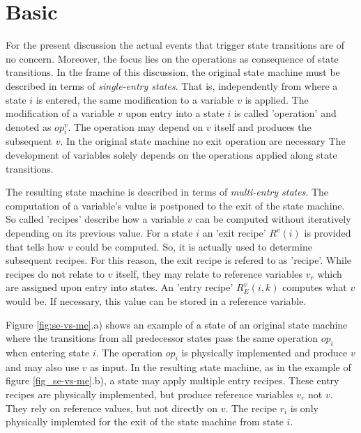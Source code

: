 \documentclass[12pt,a4paper]{scrartcl}
\begin{document}
%
\section{Basic}

For the present discussion the actual events that trigger state transitions are
of no concern. Moreover, the focus lies on the operations as consequence of
state transitions. In the frame of this discussion, the original state machine
must be described in terms of \textit{single-entry states}. That is,
independently from where a state $i$ is entered, the same modification to a
variable $v$ is applied. The modification of a variable $v$ upon entry into a
state $i$ is called 'operation' and denoted as $op^v_i$. The operation may
depend on $v$ itself and produces the subsequent $v$. In the original state
machine no exit operation are necessary The development of variables solely
depends on the operations applied along state transitions. 

The resulting state machine is described in terms of \textit{multi-entry
states}. The computation of a variable's value is postponed to the exit of the
state machine. So called 'recipes' describe how a variable $v$ can be computed
without iteratively depending on its previous value.  For a state $i$ an 'exit
recipe' $R^v(i)$ is provided that tells how $v$ could be computed.  So, it is
actually used to determine subsequent recipes. For this reason, the exit recipe
is refered to as 'recipe'.  While recipes do not relate to $v$ itself, they may
relate to reference variables $v_r$ which are assigned upon entry into states.
An 'entry recipe' $R^v_E(i,k)$ computes what $v$ would be.  If necessary, this
value can be stored in a reference variable.

Figure \ref{fig:se-vs-me}.a) shows an example of a state of an original state
machine where the transitions from all predecessor states pass the same
operation $op_i$ when entering state $i$. The operation $op_i$ is physically
implemented and produce $v$ and may also use $v$ as input. In the resulting
state machine, as in the example of figure \ref{fig_se-vs-me}.b), a state may
apply multiple entry recipes. These entry recipes are physically implemented,
but produce reference variables $v_r$ not $v$.  They rely on reference values,
but not directly on $v$. The recipe $r_i$ is only physically implemted for the
exit of the state machine from state $i$.  
\end{document}
